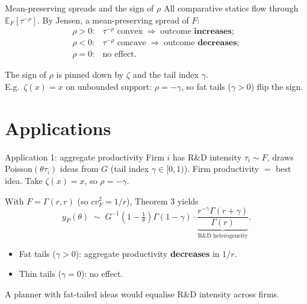 \documentclass[aspectratio=169,xcolor=dvipsnames]{beamer}
\begin{document}
\begin{frame}{Mean-preserving spreads and the sign of $\rho$}
    All comparative statics flow through $\mathbb{E}_F[\tau^{-\rho}]$. By Jensen, a mean-preserving spread of $F$:
    \[
        \begin{array}{rl}
            \rho>0:& \tau^{-\rho}\text{ convex} \;\Rightarrow\; \text{outcome }\textbf{increases}; \\[1mm]
            \rho<0:& \tau^{-\rho}\text{ concave} \;\Rightarrow\; \text{outcome }\textbf{decreases}; \\[1mm]
            \rho=0:& \text{no effect.}
        \end{array}
    \]

    \vspace{2mm}
    The sign of $\rho$ is pinned down by $\zeta$ and the tail index $\gamma$. \\[1mm]
    E.g.\ $\zeta(x)=x$ on unbounded support: $\rho = -\gamma$, so fat tails ($\gamma>0$) flip the sign.
\end{frame}

\section{Applications}

\begin{frame}{Application 1: aggregate productivity}
    Firm $i$ has R\&D intensity $\tau_i\sim F$, draws Poisson$(\theta\tau_i)$ ideas from $G$ (tail index $\gamma\in[0,1)$). Firm productivity $=$ best idea. Take $\zeta(x)=x$, so $\rho=-\gamma$.

    \vspace{2mm}
    With $F=\Gamma(r,r)$ (so $cv^2_F=1/r$), Theorem 3 yields
    \[
        y_P(\theta)
        \;\sim\;
        G^{-1}\!\left(1-\tfrac{1}{\theta}\right)\Gamma(1-\gamma)
        \cdot
        \underbrace{\frac{r^{-\gamma}\Gamma(r+\gamma)}{\Gamma(r)}}_{\text{R\&D heterogeneity}}.
    \]
    \vspace{1mm}
    \begin{itemize}
        \item Fat tails ($\gamma>0$): aggregate productivity \textbf{decreases} in $1/r$.
        \item Thin tails ($\gamma=0$): no effect.
    \end{itemize}
    \vspace{1mm}
    A planner with fat-tailed ideas would equalise R\&D intensity across firms.
\end{frame}
\end{document}
